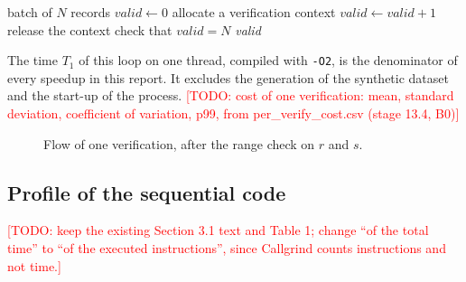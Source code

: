 \documentclass[11pt,a4paper]{article}
\newcommand{\todo}[1]{\textcolor{red}{[TODO: #1]}}
\begin{document}
\begin{algorithm}[H]
\caption{Sequential batch verification (reference solution, time $T_1$)}
\begin{algorithmic}[1]
\Require batch of $N$ records
\State $\textit{valid} \gets 0$
  \State allocate a verification context
   $\textit{valid} \gets \textit{valid}+1$ \EndIf
  \State release the context
\EndFor
\State check that $\textit{valid} = N$ 
\State \Return \textit{valid}
\end{algorithmic}
\end{algorithm}

The time $T_1$ of this loop on one thread, compiled with \texttt{-O2}, is the denominator of every speedup in this report. It excludes the generation of the synthetic dataset and the start-up of the process. \todo{cost of one verification: mean, standard deviation, coefficient of variation, p99, from per\_verify\_cost.csv (stage 13.4, B0)}

\begin{figure}[H]
\centering
{}
\caption{Flow of one verification, after the range check on $r$ and $s$.}
\end{figure}

\subsection{Profile of the sequential code}\label{sec:profile}
\todo{keep the existing Section 3.1 text and Table 1; change ``of the total time'' to ``of the executed instructions'', since Callgrind counts instructions and not time.}
\end{document}
